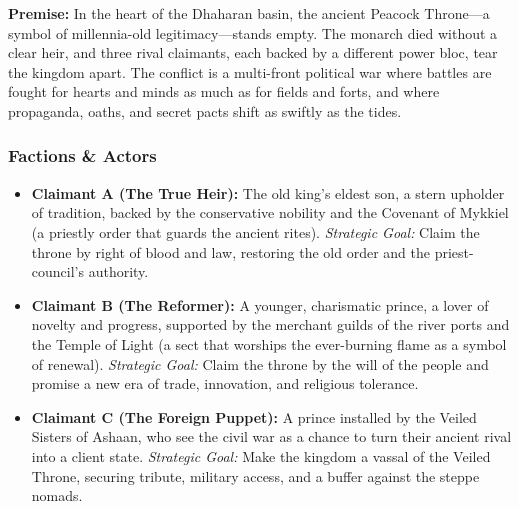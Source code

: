 \documentclass[11pt]{article}
\begin{document}
\textbf{Premise:} In the heart of the Dhaharan basin, the ancient Peacock Throne—a symbol of millennia-old legitimacy—stands empty. The monarch died without a clear heir, and three rival claimants, each backed by a different power bloc, tear the kingdom apart. The conflict is a multi-front political war where battles are fought for hearts and minds as much as for fields and forts, and where propaganda, oaths, and secret pacts shift as swiftly as the tides.

\subsubsection{Factions \& Actors}
\begin{itemize}
    \item \textbf{Claimant A (The True Heir):} The old king's eldest son, a stern upholder of tradition, backed by the conservative nobility and the Covenant of Mykkiel (a priestly order that guards the ancient rites). \textit{Strategic Goal:} Claim the throne by right of blood and law, restoring the old order and the priest-council's authority.
    \item \textbf{Claimant B (The Reformer):} A younger, charismatic prince, a lover of novelty and progress, supported by the merchant guilds of the river ports and the Temple of Light (a sect that worships the ever-burning flame as a symbol of renewal). \textit{Strategic Goal:} Claim the throne by the will of the people and promise a new era of trade, innovation, and religious tolerance.
    \item \textbf{Claimant C (The Foreign Puppet):} A prince installed by the Veiled Sisters of Ashaan, who see the civil war as a chance to turn their ancient rival into a client state. \textit{Strategic Goal:} Make the kingdom a vassal of the Veiled Throne, securing tribute, military access, and a buffer against the steppe nomads.
\end{itemize}
\end{document}

